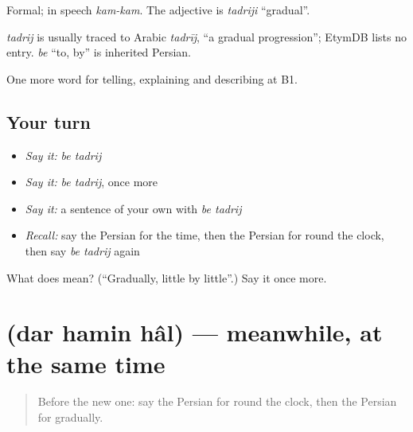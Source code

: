 Formal; in speech \emph{kam-kam}. The adjective is \emph{tadriji} \textquotedblleft{}gradual\textquotedblright{}.

\begin{cousinweb}
\emph{tadrij} is usually traced to Arabic \emph{tadrīj}, \textquotedblleft{}a gradual progression\textquotedblright{}; EtymDB lists no entry. \emph{be} \textquotedblleft{}to, by\textquotedblright{} is inherited Persian.
\end{cousinweb}

\begin{grammarlens}[title={What you've built}]
One more word for telling, explaining and describing at B1.
\end{grammarlens}

\subsection*{Your turn}
\begin{itemize}
\raggedright
  \item \emph{Say it:} \emph{be tadrij}
  \item \emph{Say it:} \emph{be tadrij}, once more
  \item \emph{Say it:} a sentence of your own with \emph{be tadrij}
  \item \emph{Recall:} say the Persian for the time, then the Persian for round the clock, then say \emph{be tadrij} again
\end{itemize}

\begin{tcolorbox}[breakable,colback=teal!4,colframe=teal!35!black,title={Before you move on}]
What does   mean? (\textquotedblleft{}Gradually, little by little\textquotedblright{}.) Say it once more.
\end{tcolorbox}
\section[\texorpdfstring{\fa{در} \fa{همین} \fa{حال} (dar hamin hâl)}{در همین حال (dar hamin hâl)}]{   (dar hamin hâl) — meanwhile, at the same time}

\label{lesson:FA-C306-dar-hamin-hal}



\begin{quote}
Before the new one: say the Persian for round the clock, then the Persian for gradually.
\end{quote}

